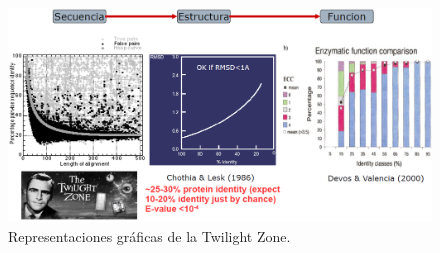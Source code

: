 \begin{figure}
\centering
\includegraphics[width = \textwidth]{figs/twilight-zone.png}
\caption{Representaciones gráficas de la Twilight Zone.}
\end{figure}


